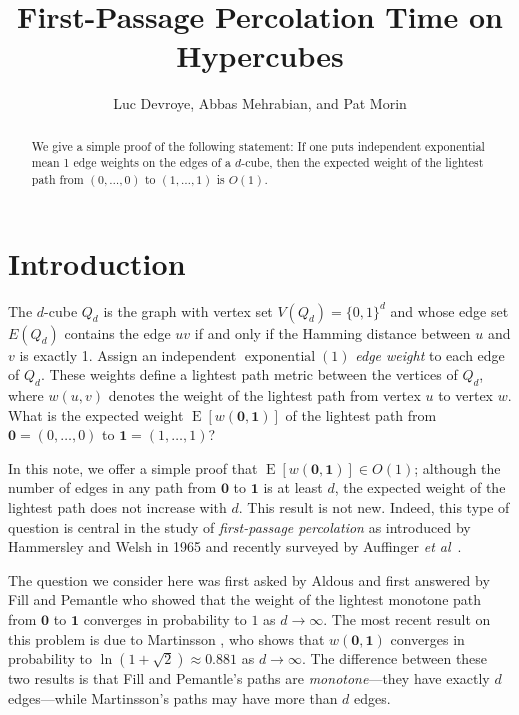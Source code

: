 \documentclass[a4paper,UKenglish]{lipics-v2016}
\title{First-Passage Percolation Time on Hypercubes}
\author{Luc Devroye, Abbas Mehrabian, and Pat Morin}
\DeclareMathOperator{\E}{E}
\DeclareMathOperator{\exponential}{exponential}
\newcommand{\zero}{\mathbf{0}}
\newcommand{\one}{\mathbf{1}}
\newcommand{\etal}{\emph{et al}}
\begin{document}
\maketitle

\begin{abstract}
We give a simple proof of the following statement: If one puts independent
exponential mean 1 edge weights on the edges of a $d$-cube, then the
expected weight of the lightest path from $(0,\ldots,0)$ to $(1,\ldots,1)$
is $O(1)$. 
\end{abstract}

\section{Introduction}

The $d$-cube $Q_d$ is the graph with vertex set $V(Q_d)=\{0,1\}^d$
and whose edge set $E(Q_d)$ contains the edge $uv$ if and only if the
Hamming distance between $u$ and $v$ is exactly 1.  Assign an independent
$\exponential(1)$ \emph{edge weight} to each edge of $Q_d$.  These weights
define a lightest path metric between the vertices of $Q_d$, where
$w(u,v)$ denotes the weight of the lightest path from vertex $u$ to vertex
$w$.  What is the expected weight $\E[w(\mathbf{0},\mathbf{1})]$ of the
lightest path from $\mathbf{0}=(0,\ldots,0)$ to $\mathbf{1}=(1,\ldots,1)$?

In this note, we offer a simple proof that $\E[w(\mathbf{0},\mathbf{1})]
\in O(1)$;  although the number of edges in any path from $\mathbf{0}$
to $\mathbf{1}$ is at least $d$, the expected weight of the lightest path
does not increase with $d$.  This result is not new.  Indeed, this type of
question is central in the study of \emph{first-passage percolation} as
introduced by Hammersley and Welsh in 1965 \cite{hammersley.welsh:first}
and recently surveyed by Auffinger \etal\ \cite{auffinger.damron.ea:50}.

The question we consider here was first asked by Aldous
\cite[Section~G7]{aldous:probability} and first answered by Fill and
Pemantle \cite{fill.pemantle:percolation} who showed that the
weight of the lightest monotone path from $\zero$ to $\one$ converges
in probability to $1$ as $d\rightarrow\infty$.  The most recent result
on this problem is due to Martinsson \cite{martinsson:unoriented},
who shows that $w(\mathbf{0},\mathbf{1})$ converges in probability to
$\ln(1+\sqrt{2})\approx 0.881$ as $d\rightarrow\infty$.  The difference
between these two results is that Fill and Pemantle's paths are \emph{monotone}---they have exactly $d$ edges---while Martinsson's paths may have more than
$d$ edges.
\end{document}

